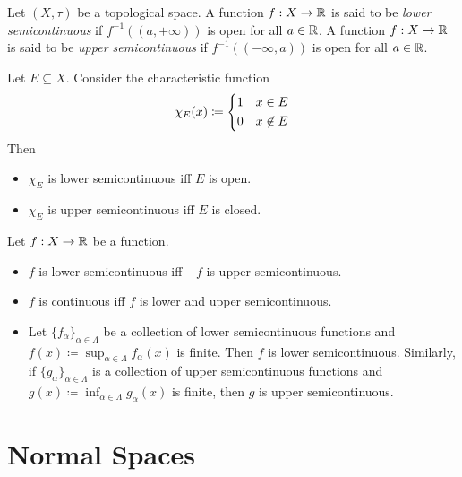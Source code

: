 \documentclass[screen,single]{techreport}
\numberwithin{equation}{section}
\begin{document}
\begin{definition}\label{De:SemiCont}
	Let $(X,\tau)$ be a topological space.
	A function $f : X \to \mathbb{R}$ is said to be \emph{lower semicontinuous} if $f^{-1}((a,+\infty))$ is open for all $a \in \mathbb{R}$.
	A function $f : X \to \mathbb{R}$ is said to be \emph{upper semicontinuous} if $f^{-1}((-\infty,a))$ is open for all $a \in \mathbb{R}$.
\end{definition}

\begin{example}\label{Exa:IndicatorsSemiCont}
	Let $E \subseteq X$.
	Consider the characteristic function
	\[
	\chi_E(x) \coloneqq
	\begin{dcases}
 		1 & x \in E \\
 		0 & x \not\in E
 	\end{dcases}
	\]
	Then
	\begin{itemize}
		\item $\chi_E$ is lower semicontinuous iff $E$ is open.
		\item $\chi_E$ is upper semicontinuous iff $E$ is closed.
	\end{itemize} 	
\end{example}

\begin{lemma}\label{Lem:SomeFactsAboutSemiCont}
	Let $f : X \to \mathbb{R}$ be a function.
	\begin{itemize}
		\item $f$ is lower semicontinuous iff $-f$ is upper semicontinuous.
		\item $f$ is continuous iff $f$ is lower and upper semicontinuous.
		\item Let $\{f_\alpha\}_{\alpha \in \Lambda}$ be a collection of lower semicontinuous functions and $f(x) \coloneqq \sup_{\alpha \in \Lambda} f_{\alpha}(x)$ is finite.
		Then $f$ is lower semicontinuous.
		Similarly, if $\{g_\alpha\}_{\alpha \in \Lambda}$ is a collection of upper semicontinuous functions and $g(x) \coloneqq \inf_{\alpha \in \Lambda} g_\alpha(x)$ is finite, then $g$ is upper semicontinuous.
	\end{itemize}
\end{lemma}

\section{Normal Spaces}
\end{document}
